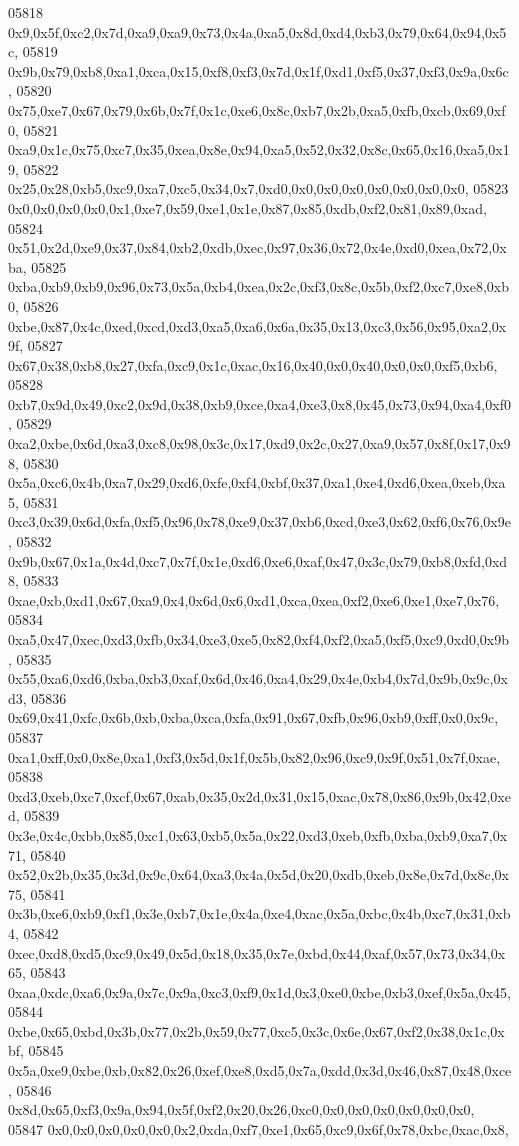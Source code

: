 \begin{DoxyCode}
05818   0x9,0x5f,0xc2,0x7d,0xa9,0xa9,0x73,0x4a,0xa5,0x8d,0xd4,0xb3,0x79,0x64,0x94,0x5c,
05819   0x9b,0x79,0xb8,0xa1,0xca,0x15,0xf8,0xf3,0x7d,0x1f,0xd1,0xf5,0x37,0xf3,0x9a,0x6c,
05820   0x75,0xe7,0x67,0x79,0x6b,0x7f,0x1c,0xe6,0x8c,0xb7,0x2b,0xa5,0xfb,0xcb,0x69,0xf0,
05821   0xa9,0x1c,0x75,0xc7,0x35,0xea,0x8e,0x94,0xa5,0x52,0x32,0x8c,0x65,0x16,0xa5,0x19,
05822   0x25,0x28,0xb5,0xc9,0xa7,0xc5,0x34,0x7,0xd0,0x0,0x0,0x0,0x0,0x0,0x0,0x0,
05823   0x0,0x0,0x0,0x0,0x1,0xe7,0x59,0xe1,0x1e,0x87,0x85,0xdb,0xf2,0x81,0x89,0xad,
05824   0x51,0x2d,0xe9,0x37,0x84,0xb2,0xdb,0xec,0x97,0x36,0x72,0x4e,0xd0,0xea,0x72,0xba,
05825   0xba,0xb9,0xb9,0x96,0x73,0x5a,0xb4,0xea,0x2c,0xf3,0x8c,0x5b,0xf2,0xc7,0xe8,0xb0,
05826   0xbe,0x87,0x4c,0xed,0xcd,0xd3,0xa5,0xa6,0x6a,0x35,0x13,0xc3,0x56,0x95,0xa2,0x9f,
05827   0x67,0x38,0xb8,0x27,0xfa,0xc9,0x1c,0xac,0x16,0x40,0x0,0x40,0x0,0x0,0xf5,0xb6,
05828   0xb7,0x9d,0x49,0xc2,0x9d,0x38,0xb9,0xce,0xa4,0xe3,0x8,0x45,0x73,0x94,0xa4,0xf0,
05829   0xa2,0xbe,0x6d,0xa3,0xc8,0x98,0x3c,0x17,0xd9,0x2c,0x27,0xa9,0x57,0x8f,0x17,0x98,
05830   0x5a,0xc6,0x4b,0xa7,0x29,0xd6,0xfe,0xf4,0xbf,0x37,0xa1,0xe4,0xd6,0xea,0xeb,0xa5,
05831   0xc3,0x39,0x6d,0xfa,0xf5,0x96,0x78,0xe9,0x37,0xb6,0xcd,0xe3,0x62,0xf6,0x76,0x9e,
05832   0x9b,0x67,0x1a,0x4d,0xc7,0x7f,0x1e,0xd6,0xe6,0xaf,0x47,0x3c,0x79,0xb8,0xfd,0xd8,
05833   0xae,0xb,0xd1,0x67,0xa9,0x4,0x6d,0x6,0xd1,0xca,0xea,0xf2,0xe6,0xe1,0xe7,0x76,
05834   0xa5,0x47,0xec,0xd3,0xfb,0x34,0xe3,0xe5,0x82,0xf4,0xf2,0xa5,0xf5,0xc9,0xd0,0x9b,
05835   0x55,0xa6,0xd6,0xba,0xb3,0xaf,0x6d,0x46,0xa4,0x29,0x4e,0xb4,0x7d,0x9b,0x9c,0xd3,
05836   0x69,0x41,0xfc,0x6b,0xb,0xba,0xca,0xfa,0x91,0x67,0xfb,0x96,0xb9,0xff,0x0,0x9c,
05837   0xa1,0xff,0x0,0x8e,0xa1,0xf3,0x5d,0x1f,0x5b,0x82,0x96,0xc9,0x9f,0x51,0x7f,0xae,
05838   0xd3,0xeb,0xc7,0xcf,0x67,0xab,0x35,0x2d,0x31,0x15,0xac,0x78,0x86,0x9b,0x42,0xed,
05839   0x3e,0x4c,0xbb,0x85,0xc1,0x63,0xb5,0x5a,0x22,0xd3,0xeb,0xfb,0xba,0xb9,0xa7,0x71,
05840   0x52,0x2b,0x35,0x3d,0x9c,0x64,0xa3,0x4a,0x5d,0x20,0xdb,0xeb,0x8e,0x7d,0x8c,0x75,
05841   0x3b,0xe6,0xb9,0xf1,0x3e,0xb7,0x1e,0x4a,0xe4,0xac,0x5a,0xbc,0x4b,0xc7,0x31,0xb4,
05842   0xec,0xd8,0xd5,0xc9,0x49,0x5d,0x18,0x35,0x7e,0xbd,0x44,0xaf,0x57,0x73,0x34,0x65,
05843   0xaa,0xdc,0xa6,0x9a,0x7c,0x9a,0xc3,0xf9,0x1d,0x3,0xe0,0xbe,0xb3,0xef,0x5a,0x45,
05844   0xbe,0x65,0xbd,0x3b,0x77,0x2b,0x59,0x77,0xc5,0x3c,0x6e,0x67,0xf2,0x38,0x1c,0xbf,
05845   0x5a,0xe9,0xbe,0xb,0x82,0x26,0xef,0xe8,0xd5,0x7a,0xdd,0x3d,0x46,0x87,0x48,0xce,
05846   0x8d,0x65,0xf3,0x9a,0x94,0x5f,0xf2,0x20,0x26,0xc0,0x0,0x0,0x0,0x0,0x0,0x0,
05847   0x0,0x0,0x0,0x0,0x0,0x2,0xda,0xf7,0xe1,0x65,0xc9,0x6f,0x78,0xbc,0xac,0x8,

\end{DoxyCode}
